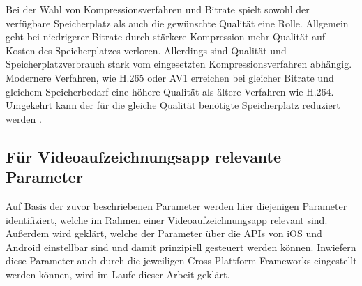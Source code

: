 Bei der Wahl von Kompressionsverfahren und Bitrate spielt sowohl der verfügbare Speicherplatz als auch die gewünschte Qualität eine Rolle.
Allgemein geht bei niedrigerer Bitrate durch stärkere Kompression mehr Qualität auf Kosten des Speicherplatzes verloren.
Allerdings sind Qualität und Speicherplatzverbrauch stark vom eingesetzten Kompressionsverfahren abhängig.
Modernere Verfahren, wie H.265 oder AV1 erreichen bei gleicher Bitrate und gleichem Speicherbedarf eine höhere Qualität als ältere Verfahren wie H.264.
Umgekehrt kann der für die gleiche Qualität benötigte Speicherplatz reduziert werden \cite[S. 253ff.]{Schmidt_Videotechnik}. 

\subsection{Für Videoaufzeichnungsapp relevante Parameter}
\label{sec:relevante_parameter}

Auf Basis der zuvor beschriebenen Parameter werden hier diejenigen Parameter identifiziert, welche im Rahmen einer Videoaufzeichnungsapp relevant sind.
Außerdem wird geklärt, welche der Parameter über die \acp{API} von iOS und Android einstellbar sind und damit prinzipiell gesteuert werden können.
Inwiefern diese Parameter auch durch die jeweiligen Cross-Plattform Frameworks eingestellt werden können, wird im Laufe dieser Arbeit geklärt.

